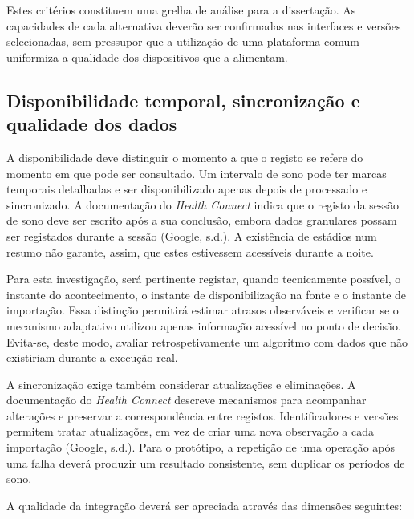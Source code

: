 Estes critérios constituem uma grelha de análise para a dissertação. As capacidades de cada alternativa deverão ser confirmadas nas interfaces e versões selecionadas, sem pressupor que a utilização de uma plataforma comum uniformiza a qualidade dos dispositivos que a alimentam.

\subsection{Disponibilidade temporal, sincronização e qualidade dos dados}
\label{sec:chap3_wearableDataQuality}

A disponibilidade deve distinguir o momento a que o registo se refere do momento em que pode ser consultado. Um intervalo de sono pode ter marcas temporais detalhadas e ser disponibilizado apenas depois de processado e sincronizado. A documentação do \textit{Health Connect} indica que o registo da sessão de sono deve ser escrito após a sua conclusão, embora dados granulares possam ser registados durante a sessão (Google, s.d.). A existência de estádios num resumo não garante, assim, que estes estivessem acessíveis durante a noite.

Para esta investigação, será pertinente registar, quando tecnicamente possível, o instante do acontecimento, o instante de disponibilização na fonte e o instante de importação. Essa distinção permitirá estimar atrasos observáveis e verificar se o mecanismo adaptativo utilizou apenas informação acessível no ponto de decisão. Evita-se, deste modo, avaliar retrospetivamente um algoritmo com dados que não existiriam durante a execução real.

A sincronização exige também considerar atualizações e eliminações. A documentação do \textit{Health Connect} descreve mecanismos para acompanhar alterações e preservar a correspondência entre registos. Identificadores e versões permitem tratar atualizações, em vez de criar uma nova observação a cada importação (Google, s.d.). Para o protótipo, a repetição de uma operação após uma falha deverá produzir um resultado consistente, sem duplicar os períodos de sono.

A qualidade da integração deverá ser apreciada através das dimensões seguintes:

